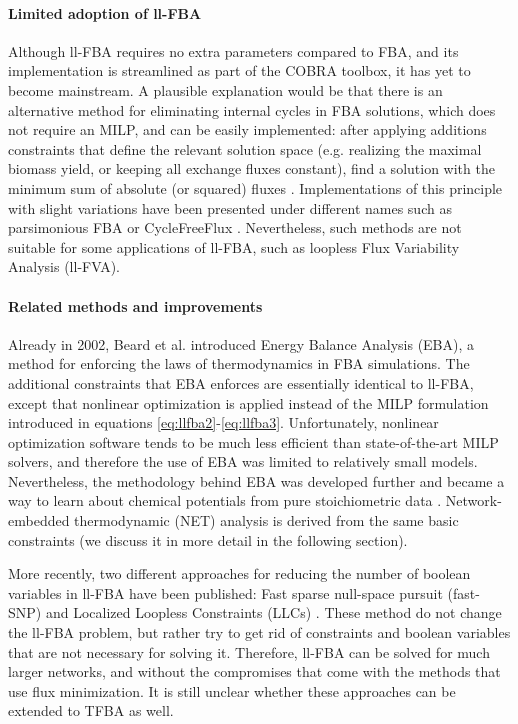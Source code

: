 \documentclass[twocolumn]{bmcart}%
\begin{document}
\paragraph{Limited adoption of ll-FBA} Although ll-FBA requires no extra parameters compared to FBA, and its implementation is streamlined as part of the COBRA toolbox, it has yet to become mainstream. A plausible explanation would be that there is an alternative method for eliminating internal cycles in FBA solutions, which does not require an MILP, and can be easily implemented: after applying additions constraints that  define the relevant solution space (e.g. realizing the maximal biomass yield, or keeping all exchange fluxes constant), find a solution with the minimum sum of absolute (or squared) fluxes \cite{Holzhutter2004-qj}. Implementations of this principle with slight variations have been presented under different names such as parsimonious FBA \cite{Lewis2010-rx, Schuetz2012-sv} or CycleFreeFlux \cite{Desouki2015-lh}. Nevertheless, such methods are not suitable for some applications of ll-FBA, such as loopless Flux Variability Analysis (ll-FVA).

\paragraph{Related methods and improvements}
Already in 2002, Beard et al. \cite{Beard2002-xt} introduced Energy Balance Analysis (EBA), a method for enforcing the laws of thermodynamics in FBA simulations. The additional constraints that EBA enforces are essentially identical to ll-FBA, except that nonlinear optimization is applied instead of the MILP formulation introduced in equations \ref{eq:llfba2}-\ref{eq:llfba3}. Unfortunately, nonlinear optimization software tends to be much less efficient than state-of-the-art MILP solvers, and therefore the use of EBA was limited to relatively small models. Nevertheless, the methodology behind EBA was developed further and became a way to learn about chemical potentials from pure stoichiometric data \cite{Beard2004, Warren2007-wm, Reznik2013}. Network-embedded thermodynamic (NET) analysis \cite{Kummel2006-px, Kummel2006-qn, Zamboni2008} is derived from the same basic constraints (we discuss it in more detail in the following section).

More recently, two different approaches for reducing the number of boolean variables in ll-FBA have been published: Fast sparse null-space pursuit (fast-SNP) \cite{Saa2016} and Localized Loopless Constraints (LLCs) \cite{Chan2017}. These method do not change the ll-FBA problem, but rather try to get rid of constraints and boolean variables that are not necessary for solving it. Therefore, ll-FBA can be solved for much larger networks, and without the compromises that come with the methods that use flux minimization. It is still unclear whether these approaches can be extended to TFBA as well.
\end{document}
